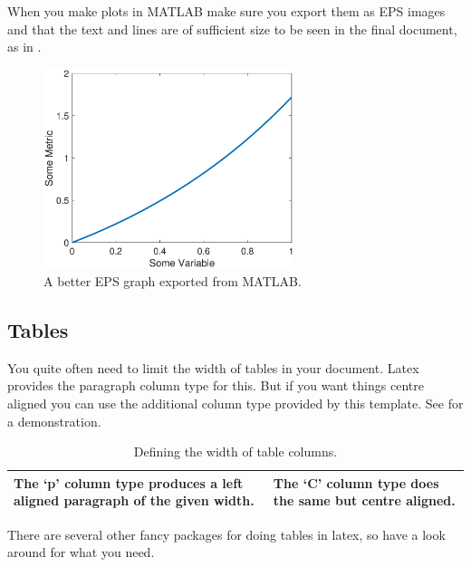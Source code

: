 \documentclass{BCUReport}
\begin{document}
\begin{appendices}
        When you make plots in MATLAB make sure you export them as EPS images and that the text and lines are of sufficient size to be seen in the final document, as in .

        \begin{figure}[ht!]
            \centering
            \includegraphics[width=0.65\textwidth]{Images/a_graph.eps}
            \caption{A better EPS graph exported from MATLAB.}
            \label{fig:BetterGraph}
        \end{figure}
    
    \subsection{Tables}
    \label{sec:Tables}
        You quite often need to limit the width of tables in your document. Latex provides the paragraph column type for this. But if you want things centre aligned you can use the additional column type provided by this template. See  for a demonstration.
    
        \begin{table}[ht!]
            \centering
            \begin{tabular}{|p{4cm}|C{4cm}|}
                \hline
                The `p' column type produces a left aligned paragraph of the given width. & The `C' column type does the same but centre aligned. \tabularnewline
                \hline
            \end{tabular}
            \caption{Defining the width of table columns.}
            \label{tab:ColumnTypes}
        \end{table}
    
        There are several other fancy packages for doing tables in latex, so have a look around for what you need.

\end{appendices}
\end{document}
